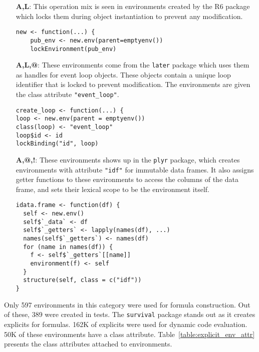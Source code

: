 \documentclass[10pt,sigplan,authorversion=true]{acmart}
\renewcommand{\c}[1]{\lstinline |#1|\xspace}
\begin{document}
\begin{itemize}
  \item[{\bf A,L}:] This operation mix is seen in environments created by the R6
    package which locks them during object instantiation to prevent any
    modification.

\begin{lstlisting}
new <- function(...) {
    pub_env <- new.env(parent=emptyenv())
    lockEnvironment(pub_env)
\end{lstlisting}\medskip

  \item[{\bf A,L,@}:] These environments come from the \c{later} package which
    uses them as handles for event loop objects. These objects contain a unique
    loop identifier that is locked to prevent modification. The environments
    are given the class attribute \c{"event_loop"}.

\begin{lstlisting}
create_loop <- function(...) {
loop <- new.env(parent = emptyenv())
class(loop) <- "event_loop"
loop$id <- id
lockBinding("id", loop)
\end{lstlisting}\medskip
  
  \item[{\bf A,@,!}:] These environments shows up in the \c{plyr} package, which
    creates environments with attribute \c{"idf"} for immutable data frames. It
    also assigns getter functions to these environments to access the columns of
    the data frame, and sets their lexical scope to be the environment itself.

\begin{lstlisting}
idata.frame <- function(df) {
  self <- new.env()
  self$`_data` <- df
  self$`_getters` <- lapply(names(df), ...)
  names(self$`_getters`) <- names(df)
  for (name in names(df)) {
    f <- self$`_getters`[[name]]
    environment(f) <- self
  }
  structure(self, class = c("idf"))
}
\end{lstlisting}\medskip
  
\end{itemize}

\noindent
Only 597 environments in this category were used for formula construction. Out
of these, 389 were created in tests. The \c{survival} package stands out as it
creates explicits for formulas. 162K of explicits were used for dynamic code
evaluation. 50K of these environments have a class attribute.
Table~\ref{table:explicit_env_attr} presents the class attributes attached to
environments.
\end{document}
